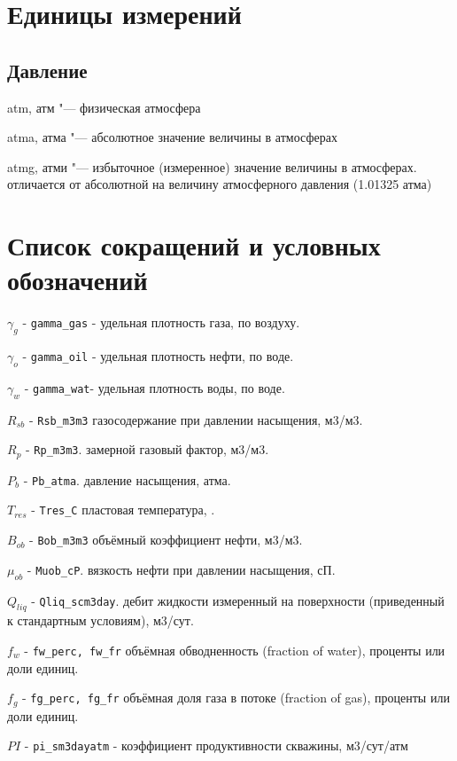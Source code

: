 \chapter*{Единицы измерений} %
\noindent

\section*{Давление}
 
 atm, атм "--- физическая атмосфера 
 
 atma, атма "--- абсолютное значение величины в атмосферах
 
 atmg, атми "--- избыточное (измеренное) значение величины в атмосферах. отличается от абсолютной на величину атмосферного давления (1.01325 атма)

\chapter*{Список сокращений и условных обозначений} %
\noindent

$\gamma_g$  - \texttt{gamma_gas} - удельная плотность газа, по воздуху. 

$\gamma_o$  - \texttt{gamma_oil} - удельная плотность нефти, по воде.

$\gamma_w$  - \texttt{gamma_wat}- удельная плотность воды, по воде. 

$R_{sb}$ - \texttt{Rsb_m3m3} газосодержание при давлении насыщения, м3/м3. 

$R_p$ - \texttt{Rp_m3m3}. замерной газовый фактор, м3/м3.

$P_b$ - \texttt{Pb_atma}. давление насыщения, атма.  

$T_{res}$ - \texttt{Tres_C} пластовая температура, \textcelsius. 

$B_{ob}$ - \texttt{Bob_m3m3} объёмный коэффициент нефти, м3/м3. 

$\mu_{ob}$ - \texttt{Muob_cP}. вязкость нефти при давлении насыщения, сП. 

$Q_{liq}$ - \texttt{Qliq_scm3day}. дебит жидкости измеренный на поверхности (приведенный к стандартным условиям), м3/сут. 

$f_{w}$ - \texttt{fw_perc, fw_fr} объёмная обводненность (fraction of water), проценты или доли единиц. 

$f_{g}$ - \texttt{fg_perc, fg_fr} объёмная доля газа в потоке (fraction of gas), проценты или доли единиц. 

$PI$ - \texttt{pi_sm3dayatm} - коэффициент продуктивности скважины, м3/сут/атм
